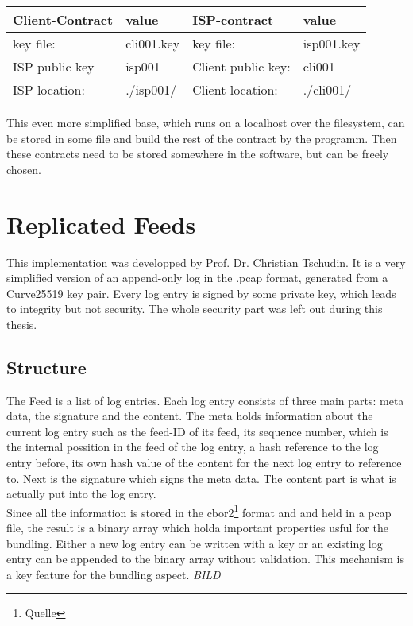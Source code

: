 \begin{center}  
    \begin{tabular}{llll} \toprule
        Client-Contract&value&ISP-contract&value\\ \midrule
        key file:& cli001.key &  key file: &isp001.key  \\ 
        ISP public key&isp001&Client public key:&cli001\\
        ISP location:&.\slash isp001\slash &Client location:& .\slash cli001\slash \\\bottomrule
    \end{tabular}  
\end{center}
This even more simplified base, which runs on a localhost over the filesystem, can be stored in some file and build the rest of the contract by the programm. Then these contracts need to be stored somewhere in the software, but can be freely chosen.

\section{Replicated Feeds}
This implementation was developped by Prof. Dr. Christian Tschudin. It is a very simplified version of an append-only log in the .pcap format, generated from a Curve25519 key pair. Every log entry is signed by some private key, which leads to integrity but not security. The whole security part was left out during this thesis.
\subsection{Structure}
The Feed is a list of log entries. Each log entry consists of three main parts: meta data, the signature and the content. The meta holds information about the current log entry such as the feed-ID of its feed, its sequence number, which is the internal possition in the feed of the log entry, a hash reference to the log entry before, its own hash value of the content for the next log entry to reference to. Next is the signature which signs the meta data. The content part is what is actually put into the log entry.\\
Since all the information is stored in the cbor2\footnote{Quelle} format and and held in a pcap file, the result is a binary array which holda important properties usful for the bundling. Either a new log entry can be written with a key or an existing log entry can be appended to the binary array without validation. This mechanism is a key feature for the bundling aspect.
\textit{BILD}
